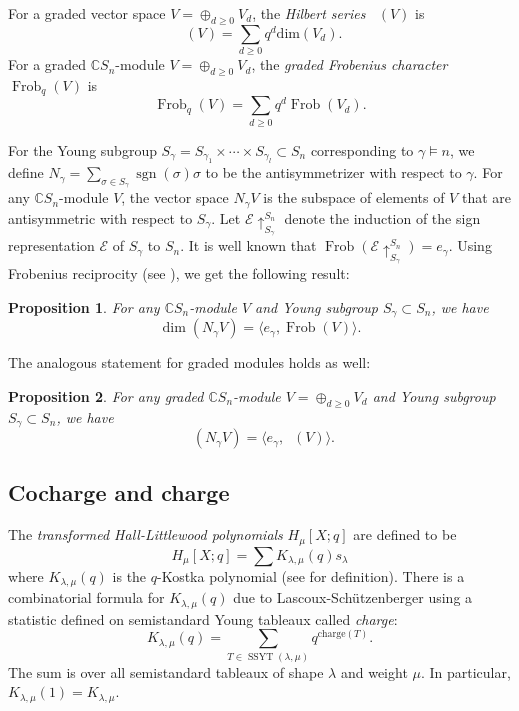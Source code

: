 \documentclass[10pt]{amsart}
\theoremstyle{plain}
\theoremstyle{definition}
\theoremstyle{plain}
\theoremstyle{plain}
\newtheorem{prop}[prop]{Proposition}
\theoremstyle{remark}
\theoremstyle{plain}
\theoremstyle{plain}
\DeclareMathOperator{\ssyt}{SSYT}
\DeclareMathOperator{\Frob}{Frob}
\DeclareMathOperator{\Hilb}{Hilb}
\DeclareMathOperator{\sgn}{sgn}
\DeclareMathOperator{\Frobq}{\Frob_q}
\DeclareMathOperator{\Hilbq}{\Hilb_q}
\begin{document}
 For a graded vector space $V = \oplus_{d\geq0} V_d$, the   \textit{Hilbert series} $\Hilbq(V)$ is 
\[\Hilbq(V) = \sum\limits_{d\geq 0} q^d \text{dim}(V_d).\]
For a graded $\mathbb{C}S_n$-module $V = \oplus_{d\geq0} V_d$, the \textit{graded Frobenius character} $\Frob_q(V)$ is 
\[\Frob_q(V) = \sum\limits_{d \geq 0} q^d \Frob(V_d).\]

For the Young subgroup $S_\gamma = S_{\gamma_1} \times \cdots \times S_{\gamma_l}\subset S_n$ corresponding to $\gamma\models n$, we define $N_{\gamma} = \sum_{\sigma\in S_\gamma} \sgn(\sigma) \sigma$ to be the antisymmetrizer with respect to $\gamma$. 
For any $\mathbb{C}S_n$-module $V$, the vector space $N_\gamma V$ is the subspace of elements of $V$ that are antisymmetric with respect to $S_\gamma$.
Let $\mathcal{E}\uparrow^{S_n}_{S_\gamma}$ denote the induction of the sign representation $\mathcal{E}$ of $S_\gamma$ to $S_n$. It is well known that $\Frob(\mathcal{E}\uparrow^{S_n}_{S_\gamma}) = e_\gamma$. Using Frobenius reciprocity (see \cite[Chapter 3.3]{Fulton-Harris}), we get the following result:
\begin{prop}
    For any $\mathbb{C}S_n$-module $V$ and Young subgroup $S_\gamma \subset S_n$, we have  $$\dim(N_\gamma V) = \langle e_\gamma, \Frob(V)\rangle.$$
\end{prop}
The analogous statement for graded modules holds as well:
\begin{prop}\label{prop: dim and antisym}
    For any graded $\mathbb{C}S_n$-module $V = \oplus_{d\geq0} V_d$ and Young subgroup $S_\gamma \subset S_n$, we have  $$\Hilbq(N_\gamma V) = \langle e_\gamma, \Frobq(V)\rangle.$$
\end{prop}


\subsection{Cocharge and charge}\label{subsection:charge}
The \textit{transformed Hall-Littlewood polynomials} $H_\mu[X;q]$ are defined to be
\[H_\mu[X;q] = \sum K_{\lambda,\mu}(q) s_\lambda\]
where $K_{\lambda,\mu}(q)$ is the $q$-Kostka polynomial (see {\cite[Chapter III.6]{macdonald}} for definition). 
There is a combinatorial formula for $K_{\lambda,\mu}(q)$ due to Lascoux-Sch\"{u}tzenberger \cite{LS1} using a statistic defined on semistandard Young tableaux called \textit{charge}:
\[K_{\lambda,\mu}(q) = \sum\limits_{T\in \ssyt(\lambda,\mu)}  q^{\text{charge}(T)}.\] 
The sum is over all semistandard tableaux of shape $\lambda$ and weight $\mu$. In particular, $K_{\lambda,\mu}(1) = K_{\lambda,\mu}$.
\end{document}
